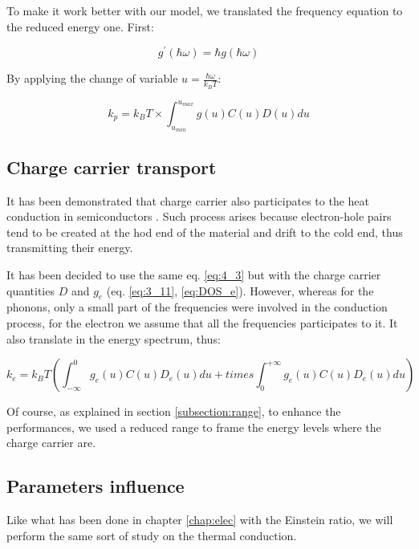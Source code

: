 To make it work better with our model, we translated the frequency equation to the reduced energy one. First:

\begin{equation}
    g^\prime(\hbar \omega) = \hbar g(\hbar\omega)
    \label{eq:4_6}
\end{equation}

By applying the change of variable $u = \frac{\hbar\omega}{k_BT}$:

\begin{equation}
    k_p = k_BT \times\int_{u_{min}}^{u_{max}} g (u) C(u)D(u)d u
    \label{eq:4_7}
\end{equation}

\subsection{Charge carrier transport}

It has been demonstrated that charge carrier also participates to the heat conduction in semiconductors \cite{thermal_transport}. Such process arises because electron-hole pairs tend to be created at the hod end of the material and drift to the cold end, thus transmitting their energy.

It has been decided to use the same eq. \ref{eq:4_3} but with the charge carrier quantities $D$ and $g_e$ (eq. \ref{eq:3_11}, \ref{eq:DOS_e}). However, whereas for the phonons, only a small part of the frequencies were involved in the conduction process, for the electron we assume that all the frequencies participates to it. It also translate in the energy spectrum, thus:

\begin{equation}
    k_e = k_BT \left(\int_{-\infty}^{0} g_e(u) C(u)D_e(u)d u + times\int_{0}^{+\infty} g_e(u) C(u)D_e(u)d u\right)
    \label{eq:4_8}
\end{equation}

Of course, as explained in section \ref{subsection:range}, to enhance the performances, we used a reduced range to frame the energy levels where the charge carrier are.

\subsection{Parameters influence}

Like what has been done in chapter \ref{chap:elec} with the Einstein ratio, we will perform the same sort of study on the thermal conduction.

